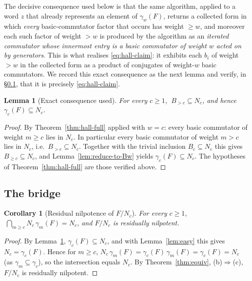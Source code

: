 \documentclass{amsart}
\newtheorem{lemma}{Lemma}
\newtheorem{corollary}{Corollary}
\theoremstyle{definition}
\theoremstyle{remark}
\begin{document}
\smallskip
The decisive consequence used below is that the same algorithm, applied to a word
$z$ that already represents an element of $\gamma_w(F)$, returns a collected form
in which \emph{every} basic-commutator factor that occurs has weight $\ge w$, and
moreover each such factor of weight $>w$ is produced by the algorithm as an
\emph{iterated commutator whose innermost entry is a basic commutator of weight
$w$ acted on by generators}. This is what realises
\eqref{eq:hall-claim}: it exhibits each $b_i$ of weight $>w$ in the collected form
as a product of conjugates of weight-$w$ basic commutators. We record this exact
consequence as the next lemma and verify, in \S\ref{ssec:bridge}, that it is
precisely \eqref{eq:hall-claim}.

\begin{lemma}[Exact consequence used]\label{lem:hall-residual}
For every $c\ge1$, $\ B_{>c}\subseteq N_c$, and hence $\gamma_c(F)\subseteq N_c$.
\end{lemma}

\begin{proof}
By Theorem~\ref{thm:hall-full} applied with $w=c$: every basic commutator of
weight $m\ge c$ lies in $N_c$. In particular every basic commutator of weight
$m>c$ lies in $N_c$, i.e.\ $B_{>c}\subseteq N_c$. Together with the trivial
inclusion $B_c\subseteq N_c$ this gives $B_{\ge c}\subseteq N_c$, and
Lemma~\ref{lem:reduce-to-Bw} yields $\gamma_c(F)\subseteq N_c$. The hypotheses of
Theorem~\ref{thm:hall-full} are those verified above.
\end{proof}

\subsection{The bridge}\label{ssec:bridge}

\begin{corollary}[Residual nilpotence of $F/N_c$]\label{cor:resnil}
For every $c\ge1$, $\ \bigcap_{m\ge c}N_c\,\gamma_m(F)=N_c$, and $F/N_c$ is
residually nilpotent.
\end{corollary}

\begin{proof}
By Lemma~\ref{lem:hall-residual}, $\gamma_c(F)\subseteq N_c$, and with
Lemma~\ref{lem:easy} this gives $N_c=\gamma_c(F)$. Hence for $m\ge c$,
$N_c\,\gamma_m(F)=\gamma_c(F)\,\gamma_m(F)=\gamma_c(F)=N_c$ (as
$\gamma_m\subseteq\gamma_c$), so the intersection equals $N_c$. By
Theorem~\ref{thm:equiv}, (b)$\Rightarrow$(c), $F/N_c$ is residually nilpotent.
\end{proof}
\end{document}

